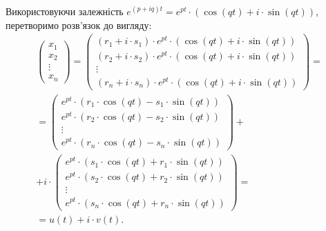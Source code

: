 \begin{enumerate}
Використовуючи залежність $e^{(p + i q) t} = e^{pt} \cdot (\cos (qt) + i \cdot \sin(qt))$, перетворимо розв’язок до вигляду:
\begin{multline*}
	\begin{pmatrix} x_1 \\ x_2 \\ \vdots \\ x_n \end{pmatrix} =
	\begin{pmatrix} (r_1 + i \cdot s_1) \cdot e^{p t} \cdot (\cos (qt) + i \cdot \sin(qt)) \\ (r_2 + i \cdot s_2) \cdot e^{p t} \cdot (\cos (qt) + i \cdot \sin(qt)) \\ \vdots \\ (r_n + i \cdot s_n) \cdot e^{p t} \cdot (\cos (qt) + i \cdot \sin(qt)) \end{pmatrix} = \\
	= \begin{pmatrix} e^{p t} \cdot (r_1 \cdot \cos (qt) - s_1 \cdot \sin(qt)) \\ e^{pt} \cdot (r_2 \cdot \cos (qt) - s_2 \cdot \sin(qt)) \\ \vdots \\ e^{pt} \cdot (r_n \cdot \cos (qt) - s_n \cdot \sin(qt)) \end{pmatrix} + \\ + i \cdot \begin{pmatrix} e^{p t} \cdot (s_1 \cdot \cos (qt) + r_1 \cdot \sin(qt)) \\ e^{pt} \cdot (s_2 \cdot \cos (qt) + r_2 \cdot \sin(qt)) \\ \vdots \\ e^{pt} \cdot (s_n \cdot \cos (qt) + r_n \cdot \sin(qt)) \end{pmatrix} = \\
	= u(t) + i \cdot v(t).
\end{multline*}


\end{enumerate}
